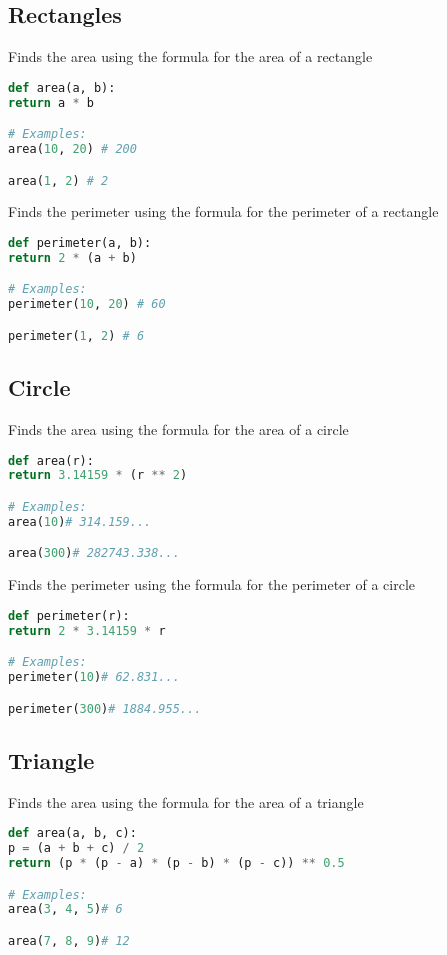 \documentclass{article}
\begin{document}
\subsection*{Rectangles}

Finds the area using the formula for the area of ​​a rectangle
\begin{lstlisting}[language=Python, caption={Area Function for Rectangle}]
def area(a, b):
return a * b

# Examples:
area(10, 20) # 200

area(1, 2) # 2
\end{lstlisting}

Finds the perimeter using the formula for the perimeter of ​​a rectangle
\begin{lstlisting}[language=Python, caption={Perimeter Function for Rectangle}]
def perimeter(a, b):
return 2 * (a + b)

# Examples:
perimeter(10, 20) # 60

perimeter(1, 2) # 6
\end{lstlisting}

\subsection*{Circle}

Finds the area using the formula for the area of ​​a circle
\begin{lstlisting}[language=Python, caption={Area Function for Circle}]
def area(r):
return 3.14159 * (r ** 2)

# Examples:
area(10)# 314.159...

area(300)# 282743.338...
\end{lstlisting}

Finds the perimeter using the formula for the perimeter of ​​a circle
\begin{lstlisting}[language=Python, caption={Perimeter Function for Circle}]
def perimeter(r):
return 2 * 3.14159 * r

# Examples:
perimeter(10)# 62.831...

perimeter(300)# 1884.955...
\end{lstlisting}

\subsection*{Triangle}

Finds the area using the formula for the area of ​​a triangle
\begin{lstlisting}[language=Python, caption={Area Function for Triangle}]
def area(a, b, c):
p = (a + b + c) / 2
return (p * (p - a) * (p - b) * (p - c)) ** 0.5

# Examples:
area(3, 4, 5)# 6

area(7, 8, 9)# 12
\end{lstlisting}
\end{document}
